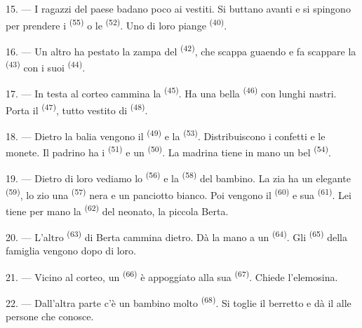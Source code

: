 15. --- I ragazzi del paese badano poco ai vestiti. Si buttano avanti e si spingono
per prendere i  \textsuperscript{(55)} o le 
\textsuperscript{(52)}. Uno di loro piange \textsuperscript{(40)}.

16. --- Un altro ha pestato la zampa del  \textsuperscript{(42)}, che
scappa guaendo e fa scappare la  \textsuperscript{(43)} con i suoi
 \textsuperscript{(44)}.

\VUsaut{5.0mm}
\VUsaut{4.0mm}

17. --- In testa al corteo cammina la  \textsuperscript{(45)}. Ha una
bella  \textsuperscript{(46)} con lunghi nastri. Porta il
 \textsuperscript{(47)}, tutto vestito di 
\textsuperscript{(48)}.

18. --- Dietro la balia vengono il  \textsuperscript{(49)} e la
 \textsuperscript{(53)}. Distribuiscono i confetti e le monete. Il
padrino ha i  \textsuperscript{(51)} e un 
\textsuperscript{(50)}. La madrina tiene in mano un bel 
\textsuperscript{(54)}.

19. --- Dietro di loro vediamo lo  \textsuperscript{(56)} e la
 \textsuperscript{(58)} del bambino. La zia ha un elegante
 \textsuperscript{(59)}, lo zio una 
\textsuperscript{(57)} nera e un panciotto bianco. Poi vengono il 
\textsuperscript{(60)} e sua  \textsuperscript{(61)}. Lei tiene per mano
la  \textsuperscript{(62)} del neonato, la piccola Berta.

20. --- L'altro  \textsuperscript{(63)} di Berta cammina dietro. Dà la
mano a un  \textsuperscript{(64)}. Gli 
\textsuperscript{(65)} della famiglia vengono dopo di loro.

\VUsaut{4.6mm}
\VUsaut{3.4mm}

21. --- Vicino al corteo, un  \textsuperscript{(66)} è appoggiato
alla sua  \textsuperscript{(67)}. Chiede l'elemosina.

22. --- Dall'altra parte c'è un bambino molto 
\textsuperscript{(68)}. Si toglie il berretto e dà il  alle
persone che conosce.

